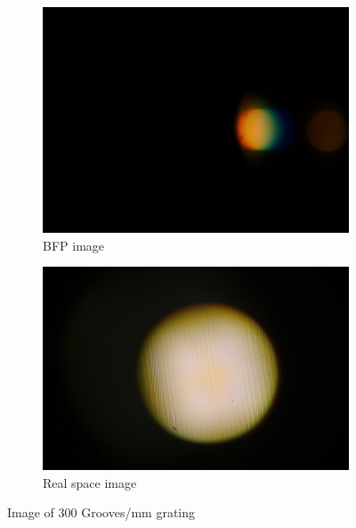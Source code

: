 \documentclass[12pt]{article}
\begin{document}
\begin{figure}[h]
    \centering
    \begin{subfigure}[b]{0.45\textwidth}
        \centering
        \includegraphics[width = \linewidth]{300bfp.jpeg}
        \caption{BFP image}
        \label{fig: 300 bfp}
    \end{subfigure}
    \begin{subfigure}[b]{0.45\textwidth}
        \centering
        \includegraphics[width = \linewidth]{300real.jpeg}
        \caption{Real space image}
        \label{fig: 300 real}
    \end{subfigure}
    \caption{Image of 300 Grooves/mm grating}
\end{figure}
\end{document}
